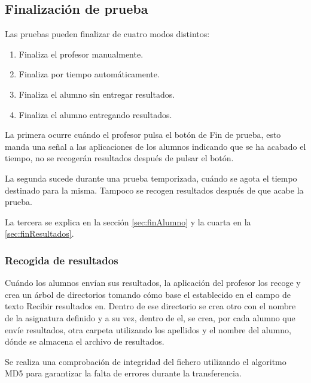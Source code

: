 \documentclass[a4paper,11pt]{article}
\begin{document}
\subsection{Finalización de prueba}
\label{sec:finalizacionPrueba}

Las pruebas pueden finalizar de cuatro modos distintos:

\begin{enumerate}

    \item Finaliza el profesor manualmente.

    \item Finaliza por tiempo automáticamente.

    \item Finaliza el alumno sin entregar resultados.

    \item Finaliza el alumno entregando resultados.

\end{enumerate}

La primera ocurre cuándo el profesor pulsa el botón de Fin de prueba, esto manda una señal a las aplicaciones de los alumnos indicando que se ha acabado el tiempo, no se recogerán resultados después de pulsar el botón.

La segunda sucede durante una prueba temporizada, cuándo se agota el tiempo destinado para la misma. Tampoco se recogen resultados después de que acabe la prueba.

La tercera se explica en la sección \ref{sec:finAlumno} y la cuarta en la \ref{sec:finResultados}.

\subsubsection{Recogida de resultados}

Cuándo los alumnos envían sus resultados, la aplicación del profesor los recoge y crea un árbol de directorios tomando cómo base el establecido en el campo de texto Recibir resultados en. Dentro de ese directorio se crea otro con el nombre de la asignatura definido y a su vez, dentro de el, se crea, por cada alumno que envíe resultados, otra carpeta utilizando los apellidos y el nombre del alumno, dónde se almacena el archivo de resultados.

Se realiza una comprobación de integridad del fichero utilizando el algoritmo MD5 para garantizar la falta de errores durante la transferencia.

\newpage
\end{document}

